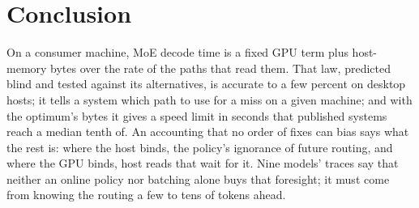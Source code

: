 \documentclass[10pt,twocolumn]{article}
\begin{document}
\section{Conclusion}
On a consumer machine, MoE decode time is a fixed GPU term plus host-memory bytes over the rate of the paths that read
them. That law, predicted blind and tested against its alternatives, is accurate to a few percent on desktop hosts;
it tells a system which path to use for a miss on a given machine; and with the optimum's bytes it gives a speed
limit in seconds that published systems reach a median tenth of. An accounting that no order of fixes can bias
says what the rest is: where the host binds, the policy's ignorance of future routing, and where the GPU binds, host
reads that wait for it. Nine models' traces say that neither an online policy nor batching alone buys that
foresight; it must come from knowing the routing a few to tens of tokens ahead.

{\small}

\clearpage
\onecolumn
\appendix

\end{document}
